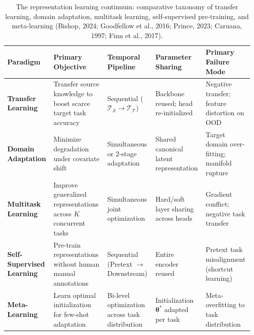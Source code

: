 \begin{table}[H]
\centering
\scriptsize
\begin{tabularx}{\textwidth}{@{}p{2.2cm}>{\raggedright\arraybackslash}X>{\raggedright\arraybackslash}p{2.2cm}>{\raggedright\arraybackslash}p{2.4cm}>{\raggedright\arraybackslash}X@{}}
\toprule
\textbf{Paradigm} & \textbf{Primary Objective} & \textbf{Temporal Pipeline} & \textbf{Parameter Sharing} & \textbf{Primary Failure Mode} \\ \midrule
\textbf{Transfer Learning} & Transfer source knowledge to boost scarce target task accuracy & Sequential ($\mathcal{T}_{\mathcal{S}} \to \mathcal{T}_{\mathcal{T}}$) & Backbone reused; head re-initialized & Negative transfer; feature distortion on OOD \\
\textbf{Domain Adaptation} & Minimize degradation under covariate shift & Simultaneous or 2-stage adaptation & Shared canonical latent representation & Target domain over-fitting; manifold rupture \\
\textbf{Multitask Learning} & Improve generalized representations across $K$ concurrent tasks & Simultaneous joint optimization & Hard/soft layer sharing across heads & Gradient conflict; negative task transfer \\
\textbf{Self-Supervised Learning} & Pre-train representations without human manual annotations & Sequential (Pretext $\to$ Downstream) & Entire encoder reused & Pretext task misalignment (shortcut learning) \\
\textbf{Meta-Learning} & Learn optimal initialization for few-shot adaptation & Bi-level optimization across task distribution & Initialization $\boldsymbol{\theta}^*$ adapted per task & Meta-overfitting to task distribution \\ \bottomrule
\end{tabularx}
\caption{The representation learning continuum: comparative taxonomy of transfer learning, domain adaptation, multitask learning, self-supervised pre-training, and meta-learning (Bishop, 2024; Goodfellow et al., 2016; Prince, 2023; Caruana, 1997; Finn et al., 2017).}
\label{tab:representation_learning_continuum}
\end{table}
